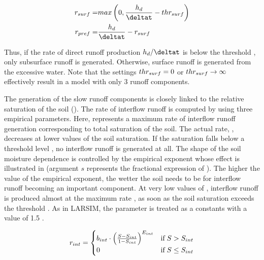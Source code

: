 \begin{align}
  \rateRunoffSurf =& max\left( 0, \frac{\heightRunoffDirect}{\deltat} - \thresholdSurf \right) \label{eqn:runGen4comp_surfaceRunoff} \\
  \rateRunoffPref =& \frac{\heightRunoffDirect}{\deltat} - \rateRunoffSurf \label{eqn:runGen4comp_prefRunoff}
\end{align}

Thus, if the rate of direct runoff production $\heightRunoffDirect/\deltat$ is below the threshold \thresholdSurf{}, only subsurface runoff is generated. Otherwise, surface runoff is generated from the excessive water. Note that the settings ${thr_{surf}}{}=0$ or ${thr_{surf}}{} \rightarrow \infty$ effectively result in a model with only 3 runoff components.

The generation of the slow runoff components is closely linked to the relative saturation of the soil \relSat{} (). The rate of interflow runoff is computed by  using three empirical parameters. Here, \facInter{} represents a maximum rate of interflow runoff generation corresponding to total saturation of the soil. The actual rate, \rateRunoffInter{}, decreases at lower values of the soil saturation. If the saturation falls below a threshold level \relSatInter{}, no interflow runoff is generated at all. The shape of the soil moisture dependence is controlled by the empirical exponent \expInter{} whose effect is illustrated in  (argument $s$ represents the fractional expression of ). The higher the value of the empirical exponent, the wetter the soil needs to be for interflow runoff becoming an important component. At very low values of \expInter{}, interflow runoff is produced almost at the maximum rate \facInter{}, as soon as the soil saturation exceeds the threshold \relSatInter{}. As in LARSIM, the parameter \expInter{} is treated as a constants with a value of 1.5 \citep{Bremicker2006}.

\begin{align} \label{eqn:runGen4comp_interRunoff}
  r_{int} =
  \begin{cases}
    {b_{int}} \cdot \left( \frac{S-S_{int}}{1 - S_{int}} \right) ^ {{E_{int}}} & \text{if} \; S > S_{int} \\
    0 & \text{if} \; S \le S_{int} \\
  \end{cases}
\end{align}

